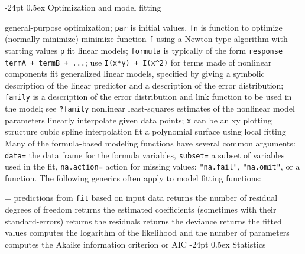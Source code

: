 \documentclass[10pt,landscape]{article}
\makeatletter
\renewcommand\section{\@startsection{section}{1}{0mm}%
                                     {-24pt}%
                                     {0.5ex}%
                                {\color{blue}\normalfont\large\bfseries}}
\newcommand{\code}{\texttt}
\makeatother
\begin{document}
\begin{multicols*}{3}
\section{Optimization and model fitting}
\everypar={\hangindent=9mm}

 general-purpose optimization; \code{par} is initial values, \code{fn}	{is function to optimize (normally minimize)}
 minimize function \code{f}	{using a Newton-type algorithm with starting values \code{p}}
 fit linear models; \code{formula} is typically of the form \code{response ~ termA + termB + ...}; use \code{I(x*y) + I(x\^{}2)}	{for terms made of nonlinear components}
 fit generalized linear models, specified by giving a symbolic description of the linear predictor and a description of the error distribution; \code{family}	{is a description of the error distribution and link function to be used in the model; see \code{?family}}
	{nonlinear least-squares estimates of the nonlinear model parameters}
 linearly interpolate given data points; \code{x}	{can be an xy plotting structure}
	{cubic spline interpolation}
	{fit a polynomial surface using local fitting}
\everypar={\hangindent=0mm}
Many of the formula-based modeling functions have several common
arguments: \code{data=} the data frame for the formula variables,
\code{subset=} a subset of variables used in the fit,
\code{na.action=} action for missing values: \code{"na.fail"}, \code{"na.omit"}, or
a function. The following generics often apply to model fitting functions:

\everypar={\hangindent=9mm}
  predictions from \code{fit}	{based on input data}
	{ returns the number of residual degrees of freedom}
	{ returns the estimated coefficients (sometimes with their standard-errors)}
	{ returns the residuals}
	{ returns the deviance}
	{ returns the fitted values}
	{ computes the logarithm of the likelihood and the number of parameters}
	{ computes the Akaike information criterion or AIC}
\section{Statistics}
\everypar={\hangindent=9mm}


\end{multicols*}
\end{document}
